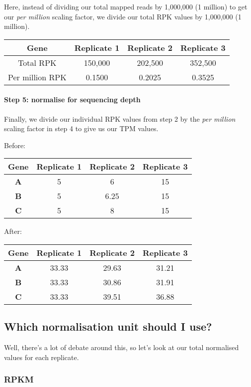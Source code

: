\documentclass[11pt]{article}
\begin{document}
Here, instead of dividing our total mapped reads by 1,000,000 (1
million) to get our \textit{per million} scaling factor, we divide our
total RPK values by 1,000,000 (1 million).

\begin{longtable}[]{@{}cccc@{}}
\hline
Gene & Replicate 1 & Replicate 2 & Replicate 3\tabularnewline
\hline
\endhead
Total RPK & 150,000 & 202,500 & 352,500\tabularnewline
Per million RPK & 0.1500 & 0.2025 & 0.3525\tabularnewline
\hline
\end{longtable}

\hypertarget{step-5-normalise-for-sequencing-depth}{%
\paragraph{Step 5: normalise for sequencing
depth}\label{step-5-normalise-for-sequencing-depth}}

Finally, we divide our individual RPK values from step 2 by the
\textit{per million} scaling factor in step 4 to give us our TPM values.

Before:

\begin{longtable}[]{@{}cccc@{}}
\hline
Gene & Replicate 1 & Replicate 2 & Replicate 3\tabularnewline
\hline
\endhead
\textbf{A} & 5 & 6 & 15\tabularnewline
\textbf{B} & 5 & 6.25 & 15\tabularnewline
\textbf{C} & 5 & 8 & 15\tabularnewline
\hline
\end{longtable}

After:

\begin{longtable}[]{@{}cccc@{}}
\hline
Gene & Replicate 1 & Replicate 2 & Replicate 3\tabularnewline
\hline
\endhead
\textbf{A} & 33.33 & 29.63 & 31.21\tabularnewline
\textbf{B} & 33.33 & 30.86 & 31.91\tabularnewline
\textbf{C} & 33.33 & 39.51 & 36.88\tabularnewline
\hline
\end{longtable}

\newpage

    \hypertarget{which-normalisation-unit-should-i-use}{%
\subsection{Which normalisation unit should I
use?}\label{which-normalisation-unit-should-i-use}}

Well, there's a lot of debate around this, so let's look at our total
normalised values for each replicate.

\hypertarget{rpkm}{%
\subsubsection{RPKM}\label{rpkm}}
\end{document}
